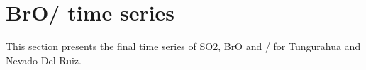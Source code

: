 \documentclass  [
  paper    = a4,
  BCOR     = 10mm,
  twoside,
  fontsize = 12pt,
  fleqn,
  toc      = bibnumbered,
  toc      = listofnumbered,
  numbers  = noendperiod,
  headings = normal,
  listof   = leveldown,
  version  = 3.03
]                                       {scrreprt}
\begin{document}
\section{BrO/  time series}

This section presents the final time series of SO2, BrO and /  for Tungurahua and Nevado Del Ruiz.\\


\end{document}
